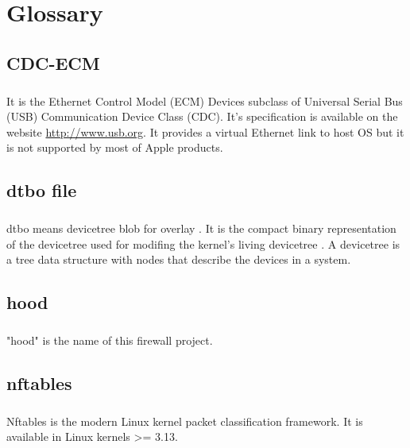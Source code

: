 \documentclass[mscthesis]{usiinfthesis}
\begin{document}
\backmatter

\chapter{Glossary} %
\section{CDC-ECM}\label{sec:CDC-ECM}
\paragraph{}
It is the Ethernet Control Model (ECM) Devices subclass of Universal Serial Bus (USB) Communication Device Class (CDC). It's specification is available on the website \url{http://www.usb.org}. It provides a virtual Ethernet link to host OS but it is not supported by most of Apple products.

\section{dtbo file}\label{sec:dtbo}
\paragraph{}
dtbo means devicetree blob for overlay \citep{dtbo:android}. It is the compact binary representation of the devicetree used for modifing the kernel's living devicetree \citep{dtbo:kernel}. A devicetree is a tree data structure with nodes that describe the devices in a system. \citep{dtbo:spec}

\section{hood}\label{sec:hood}
\paragraph{}
"hood" is the name of this firewall project.

\section{nftables}\label{sec:nftables}
\paragraph{}
Nftables is the modern Linux kernel packet classification framework. It is available in Linux kernels >= 3.13.
\end{document}

